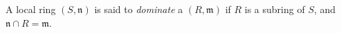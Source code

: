 \documentclass[12pt]{article}
\newcommand{\mf}[1]{\ensuremath{\mathfrak{#1}}}
\begin{document}
A local ring  $ (S,\mf{n}) $ is said to \emph{dominate} a  $ (R,\mf{m}) $ if $ R $ is a subring of $ S $, and $ \mf{n} \cap R = \mf{m} $.
\end{document}

